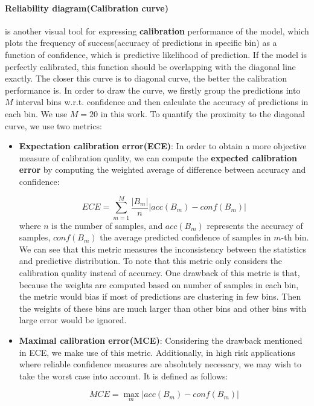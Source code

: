 \paragraph{Reliability diagram(Calibration curve)} is another visual tool for expressing \textbf{calibration} performance of the model\cite{guo2017calibration}, which plots the frequency of success(accuracy of predictions in specific bin) as a function of confidence, which is predictive likelihood of prediction. If the model is perfectly calibrated, this function should be overlapping with the diagonal line exactly. The closer this curve is to diagonal curve, the better the calibration performance is. In order to draw the curve, we firstly group the predictions into $M$ interval bins w.r.t. confidence and then calculate the accuracy of predictions in each bin. We use $M=20$ in this work. To quantify the proximity to the diagonal curve, we use two metrics:
\begin{itemize}
	\item \textbf{Expectation calibration error(ECE)}: In order to obtain a more objective measure of calibration quality, we can compute the \textbf{expected calibration error} by computing the weighted average of difference between accuracy and confidence:
	
	\begin{equation}
	ECE = \sum_{m=1}^{M}\frac{|B_m|}{n}|acc(B_m) - conf(B_m)|
	\end{equation}
	where $n$ is the number of samples, and $acc(B_m)$ represents the accuracy of samples, $conf(B_m)$ the average predicted confidence of samples in $m$-th bin. We can see that this metric measures the inconsistency between the statistics and predictive distribution. To note that this metric only considers the calibration quality instead of accuracy. One drawback of this metric is that, because the weights are computed based on number of samples in each bin, the metric would bias if most of predictions are clustering in few bins. Then the weights of these bins are much larger than other bins and other bins with large error would be ignored. 
	
	\item \textbf{Maximal calibration error(MCE)}:
	Considering the drawback mentioned in ECE, we make use of this metric. Additionally, in high risk applications where reliable confidence measures are absolutely necessary, we may wish to take the worst case into account. It is defined as follows:
	
	\begin{equation}
	MCE = \max_m|acc(B_m) - conf(B_m)|
	\end{equation}
\end{itemize}


